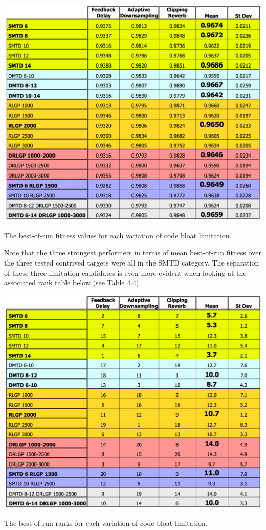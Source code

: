 \documentclass[a4paper,12pt]{report} 	%
\numberwithin{figure}{chapter}
\numberwithin{table}{chapter}
\numberwithin{equation}{chapter}
\begin{document}
\begin{flushleft}
\begin{table}[h!]
\begin{center}
\includegraphics[scale=0.6,width=\linewidth]{ResourceLimTable1}
\caption[Code Bloat Limitation Best-of-Run Values]{The best-of-run fitness values for each variation of code bloat limitation.}
\end{center}
\end{table}

Note that the three strongest performers in terms of mean best-of-run fitness over the three tested contrived targets were all in the SMTD category. The separation of these three limitation candidates is even more evident when looking at the associated rank table below (see Table 4.4).

\begin{table}[h!]
\begin{center}
\includegraphics[scale=0.6,width=\linewidth]{ResourceLimTable2}
\caption[Code Bloat Limitation Best-of-Run Ranks]{The best-of-run ranks for each variation of code bloat limitation.}
\end{center}
\end{table}


\end{flushleft}
\end{document}
